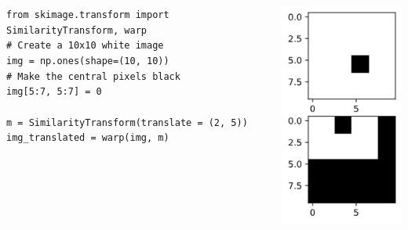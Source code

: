 \documentclass[9pt, aspectratio=169]{beamer}
\begin{document}
\begin{frame}
    \begin{columns}
        \begin{column}{0.7\textwidth}
            \begin{codebox}
                \texttt{from skimage.transform import SimilarityTransform, warp\\
                    \# Create a 10x10 white image\\
                    img = np.ones(shape=(10, 10))\\
                    \# Make the central pixels black\\
                    img[5:7, 5:7] = 0\\
                    \\
                    m = SimilarityTransform(translate = (2, 5))\\
                    img\_translated = warp(img, m)
                }
            \end{codebox}
        \end{column}
        \pause
        \begin{column}{0.3\textwidth}
            \includegraphics[width=.6\textwidth]{translation.png}
        \end{column}
    \end{columns}
\end{frame}
\end{document}
